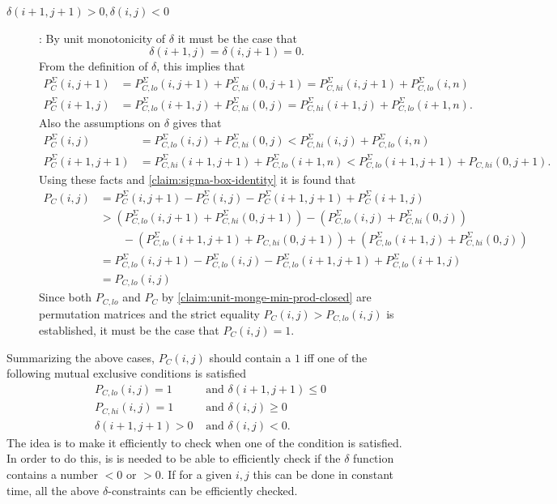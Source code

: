 \documentclass[twoside,11pt,openright]{report}
\begin{document}
\begin{description}
  \item[$\delta(i + 1, j + 1) > 0, \delta(i, j) < 0$]: By unit monotonicity of $\delta$ it must be the case that
  \[
    \delta(i + 1, j) = \delta(i, j + 1) = 0.
  \]
  From the definition of $\delta$, this implies that
  \begin{align*}
    P_C^{\Sigma}(i, j + 1) &= P_{C,lo}^{\Sigma}(i, j + 1) + P_{C,hi}^{\Sigma}(0, j + 1) = P_{C,hi}^{\Sigma}(i, j + 1) + P_{C,lo}^{\Sigma}(i, n) \\
    P_C^{\Sigma}(i + 1, j) &= P_{C,lo}^{\Sigma}(i + 1, j) + P_{C,hi}^{\Sigma}(0, j) = P_{C,hi}^{\Sigma}(i + 1, j) + P_{C,lo}^{\Sigma}(i + 1, n).
  \end{align*}
  Also the assumptions on $\delta$ gives that
  \begin{align*}
    P_C^\Sigma(i, j) &= P_{C,lo}^{\Sigma}(i, j) + P_{C,hi}^{\Sigma}(0, j) < P_{C,hi}^{\Sigma}(i, j) + P_{C,lo}^{\Sigma}(i, n) \\
    P_C^{\Sigma}(i + 1, j + 1) &= P_{C,hi}^{\Sigma}(i + 1, j + 1) + P_{C,lo}^{\Sigma}(i + 1, n) < P_{C,lo}^{\Sigma}(i + 1, j + 1) + P_{C,hi}(0, j + 1).
  \end{align*}
  Using these facts and \cref{claim:sigma-box-identity} it is found that
  \begin{align*}
    P_C(i, j) &= P_C^{\Sigma}(i, j + 1) - P_C^{\Sigma}(i, j) - P_C^{\Sigma}(i + 1, j + 1) + P_C^{\Sigma}(i + 1, j) \\
    &> (P_{C,lo}^{\Sigma}(i, j + 1) + P_{C,hi}^{\Sigma}(0, j + 1)) - (P_{C,lo}^{\Sigma}(i, j) + P_{C,hi}^{\Sigma}(0, j)) \\&\quad\quad - (P_{C,lo}^{\Sigma}(i + 1, j + 1) + P_{C,hi}(0, j + 1)) + (P_{C,lo}^{\Sigma}(i + 1, j) + P_{C,hi}^{\Sigma}(0, j)) \\
    &= P_{C,lo}^{\Sigma}(i, j + 1) - P_{C,lo}^{\Sigma}(i, j) - P_{C,lo}^{\Sigma}(i + 1, j + 1) + P_{C,lo}^{\Sigma}(i + 1, j) \\
    &= P_{C,lo}(i, j)
  \end{align*}
  Since both $P_{C,lo}$ and $P_C$ by \cref{claim:unit-monge-min-prod-closed} are permutation matrices and the strict equality $P_C(i, j) > P_{C,lo}(i, j)$ is established, it must be the case that $P_C(i, j) = 1$.
\end{description}
Summarizing the above cases, $P_C(i, j)$ should contain a $1$ iff one of the following mutual exclusive conditions is satisfied
\begin{align}
  P_{C,lo}(i, j) = 1 &\text{ and } \delta(i + 1, j + 1) \leq 0 \\
  P_{C,hi}(i, j) = 1 &\text{ and } \delta(i, j) \geq 0 \\
  \delta(i + 1, j + 1) > 0 &\text{ and } \delta(i, j) < 0.
\end{align}
The idea is to make it efficiently to check when one of the condition is satisfied. In order to do this, is is needed to be able to efficiently check if the $\delta$ function contains a number $< 0$ or $> 0$. If for a given $i, j$ this can be done in constant time, all the above $\delta$-constraints can be efficiently checked.
\end{document}
